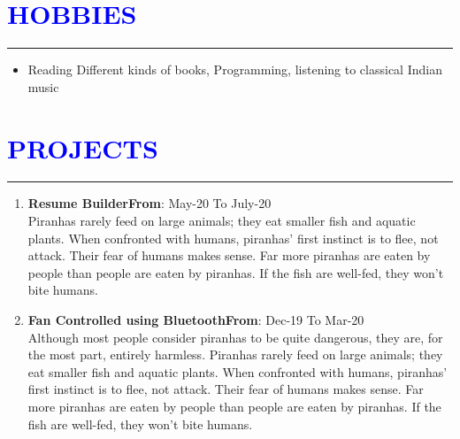 \documentclass{article}
\begin{document}
\section*{\large{\textcolor{blue}{\uppercase{Hobbies}}}}
\hrule
\vspace{3pt}
\begin{itemize}[noitemsep,nolistsep]
	\item Reading Different kinds of books, Programming, listening to classical Indian music
\end{itemize}

\vspace{3pt}
\section*{\large{\textcolor{blue}{\uppercase{projects}}}}
\hrule
\vspace{3pt}
\begin{enumerate}
	\item {\textbf{Resume Builder}}\hfill {\textbf{From}}: May-20 To July-20\\
	Piranhas rarely feed on large animals; they eat smaller fish and aquatic plants. When confronted with humans, piranhas’ first instinct is to flee, not attack. Their fear of humans makes sense. Far more piranhas are eaten by people than people are eaten by piranhas. If the fish are well-fed, they won’t bite humans.
	\item {\textbf{Fan Controlled using Bluetooth}}\hfill {\textbf{From}}: Dec-19 To Mar-20\\
	Although most people consider piranhas to be quite dangerous, they are, for the most part, entirely harmless. Piranhas rarely feed on large animals; they eat smaller fish and aquatic plants. When confronted with humans, piranhas’ first instinct is to flee, not attack. Their fear of humans makes sense. Far more piranhas are eaten by people than people are eaten by piranhas. If the fish are well-fed, they won’t bite humans.
\end{enumerate}
	
\vspace{3pt}
\end{document}

